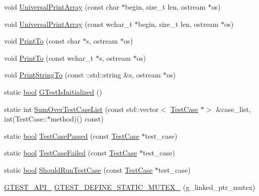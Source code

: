 \begin{DoxyCompactItemize}
\item 
void \hyperlink{namespacetesting_1_1internal_a070107e7a8205ad6ec4d538d52b15b38}{Universal\+Print\+Array} (const char $\ast$begin, size\+\_\+t len, ostream $\ast$os)
\item 
void \hyperlink{namespacetesting_1_1internal_a52394019018eb5079f9f1bcca23dcd60}{Universal\+Print\+Array} (const wchar\+\_\+t $\ast$begin, size\+\_\+t len, ostream $\ast$os)
\item 
void \hyperlink{namespacetesting_1_1internal_adc6c98306d40b53fd07be4e295102a0a}{Print\+To} (const char $\ast$s, ostream $\ast$os)
\item 
void \hyperlink{namespacetesting_1_1internal_afc20fb56b2547a8f91f9ff99650f2024}{Print\+To} (const wchar\+\_\+t $\ast$s, ostream $\ast$os)
\item 
void \hyperlink{namespacetesting_1_1internal_ad609167d8d6792b0fb186539e0e159bd}{Print\+String\+To} (const \+::std\+::string \&s, ostream $\ast$os)
\item 
static \hyperlink{classbool}{bool} \hyperlink{namespacetesting_1_1internal_a91e707e0d371fae0224ffd37f0d042af}{G\+Test\+Is\+Initialized} ()
\item 
static int \hyperlink{namespacetesting_1_1internal_a564f9e608c608736ebe2199ab831745b}{Sum\+Over\+Test\+Case\+List} (const std\+::vector$<$ \hyperlink{classtesting_1_1TestCase}{Test\+Case} $\ast$$>$ \&case\+\_\+list, int(Test\+Case\+::$\ast$method)() const)
\item 
static \hyperlink{classbool}{bool} \hyperlink{namespacetesting_1_1internal_aadc7afca7aab40f7f1d41bc17974459a}{Test\+Case\+Passed} (const \hyperlink{classtesting_1_1TestCase}{Test\+Case} $\ast$test\+\_\+case)
\item 
static \hyperlink{classbool}{bool} \hyperlink{namespacetesting_1_1internal_a53454b6089c1c5b25319caa9de6c5c02}{Test\+Case\+Failed} (const \hyperlink{classtesting_1_1TestCase}{Test\+Case} $\ast$test\+\_\+case)
\item 
static \hyperlink{classbool}{bool} \hyperlink{namespacetesting_1_1internal_a73e562dfef3eb7b30dfbb7b5e88e6df2}{Should\+Run\+Test\+Case} (const \hyperlink{classtesting_1_1TestCase}{Test\+Case} $\ast$test\+\_\+case)
\item 
\hyperlink{gtest-port_8h_aa73be6f0ba4a7456180a94904ce17790}{G\+T\+E\+S\+T\+\_\+\+A\+P\+I\+\_\+} \hyperlink{namespacetesting_1_1internal_aff419d76acc3727be48d195f927189c9}{G\+T\+E\+S\+T\+\_\+\+D\+E\+F\+I\+N\+E\+\_\+\+S\+T\+A\+T\+I\+C\+\_\+\+M\+U\+T\+E\+X\+\_\+} (g\+\_\+linked\+\_\+ptr\+\_\+mutex)
\item 
$$
\end{DoxyCompactItemize}
